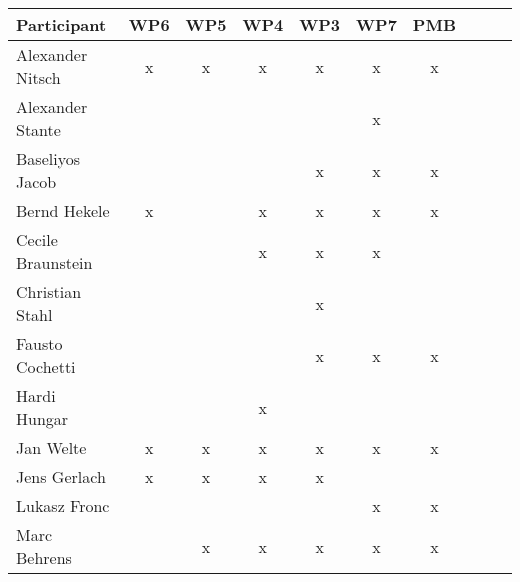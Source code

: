 \documentclass[a4paper, 11pt]{article}
\begin{document}
\begin{tabular}{|l|c|c|c||c|c|c||c|c|c|}
\hline
\textbf{Participant} & \textbf{WP6} &  \textbf{WP5} & \textbf{WP4}&  \textbf{WP3} & \textbf{WP7}&  \textbf{PMB} \\\hline
Alexander Nitsch     & x & x & x & x & x & x \\\hline  
Alexander Stante     &   &   &   &   & x &   \\\hline 
Baseliyos Jacob      &   &   &   & x & x & x \\\hline 
Bernd Hekele         & x &   & x & x & x & x \\\hline
Cecile Braunstein    &   &   & x & x & x &   \\\hline
Christian Stahl      &   &   &   & x &   &   \\\hline
Fausto Cochetti      &   &   &   & x & x & x \\\hline
Hardi Hungar         &   &   & x &   &   &   \\\hline
Jan Welte            & x & x & x & x & x & x \\\hline
Jens Gerlach         & x & x & x & x &   &   \\\hline
Lukasz Fronc         &   &   &   &   & x & x \\\hline
Marc Behrens         &   & x & x & x & x & x \\\hline

\end{tabular}
\end{document}
